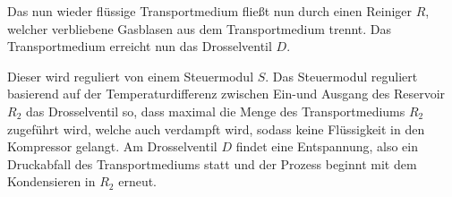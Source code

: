 Das nun wieder flüssige Transportmedium fließt nun durch einen Reiniger $R$, welcher verbliebene Gasblasen aus dem Transportmedium trennt.
Das Transportmedium erreicht nun das Drosselventil $D$.

Dieser wird reguliert von einem Steuermodul $S$. Das Steuermodul reguliert basierend auf der Temperaturdifferenz zwischen Ein-und Ausgang des Reservoir $R_2$ das Drosselventil so, dass maximal die Menge des Transportmediums $R_2$ zugeführt wird, welche auch verdampft wird, sodass keine Flüssigkeit in den Kompressor gelangt.
Am Drosselventil $D$ findet eine Entspannung, also ein Druckabfall des Transportmediums statt und der Prozess beginnt mit dem Kondensieren in $R_2$ erneut.
